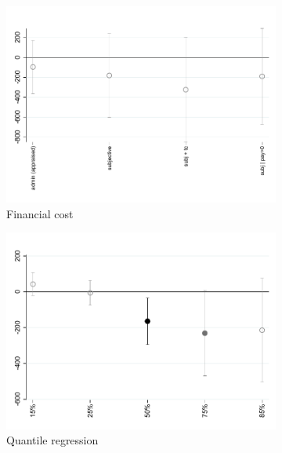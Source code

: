 \documentclass[11pt]{article}
\begin{document}
\begin{figure}[H]
    \caption{“Forced commitment with promise Treatment Effects}
    \label{fc_pro3}
    \begin{center}
    \begin{subfigure}{0.45\textwidth}
        \caption{Financial cost}
        \centering
        \includegraphics[width=\textwidth]{Figuras/fc_te_pro_3.pdf}
    \end{subfigure}
        \begin{subfigure}{0.45\textwidth}
        \caption{Quantile regression}
        \centering
        \includegraphics[width=\textwidth]{Figuras/fc_quantile_pro_3.pdf}
    \end{subfigure}
    \begin{subfigure}{0.55\textwidth}

\end{subfigure}
\end{center}
\end{figure}
\end{document}
